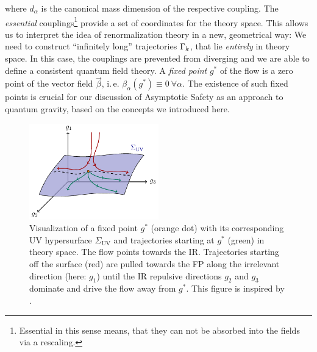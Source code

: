 where $d_{\alpha}$ is the canonical mass dimension of the respective coupling. The \textit{essential} couplings\footnote{Essential in this sense means, that they can not be absorbed into the fields via a rescaling.} provide a set of coordinates for the theory space. This allows us to interpret the idea of renormalization theory in a new, geometrical way: We need to construct \enquote{infinitely long} trajectories $\Gamma_{k}$, that lie \textit{entirely} in theory space. In this case, the couplings are prevented from diverging and we are able to define a consistent quantum field theory. \newpage
A \textit{fixed point} $g^{*}$ of the flow is a zero point of the vector field $\vec{\beta}$, i.\,e.  $\beta_{\alpha}(g^{*})\equiv 0 \ \forall \alpha$. The existence of such fixed points is crucial for our discussion of Asymptotic Safety as an approach to quantum gravity, based on the concepts we introduced here. \\
\begin{figure}[t]
	\centering
	\includegraphics[width=0.5\textwidth]{figs/TikZ/hypersurface}
	\caption[Visualization of a fixed point with its corresponding UV hypersurface $\Sigma_{\mathrm{UV}}$ in theory space.]{Visualization of a fixed point $g^{*}$ (orange dot) with its corresponding UV hypersurface $\Sigma_{\mathrm{UV}}$ and trajectories starting at $g^{*}$ (green) in theory space. The flow points towards the IR. Trajectories starting off the surface (red) are pulled towards the FP along the irrelevant direction (here: $g_1$) until  the IR repulsive directions $g_2$ and $g_3$ dominate and drive the flow away from $g^{*}$. This figure is inspired by \cite{Eichhorn2018}.}\label{fig:hypersurface}
	\hrulefill
\end{figure}
